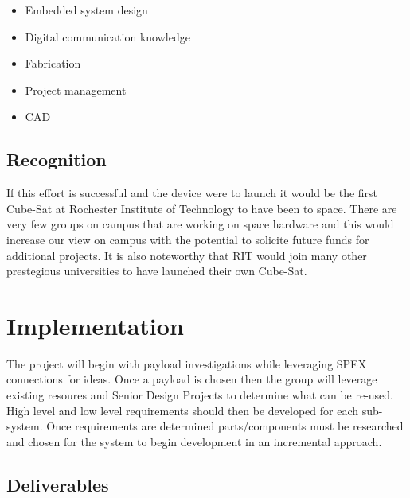 \documentclass[conference]{IEEEtran} %
\begin{document}
\begin{itemize}
\item Embedded system design
\item Digital communication knowledge
\item Fabrication
\item Project management
\item CAD
\end{itemize}


\subsection{Recognition}
\label{subsec:PublishedContent}
If this effort is successful and the device were to launch it would be the first Cube-Sat at Rochester Institute of Technology to have been to space.  There are very few groups on campus that are working on space hardware and this would increase our view on campus with the potential to solicite future funds for additional projects.  It is also noteworthy that RIT would join many other prestegious universities to have launched their own Cube-Sat.



\section{Implementation}
\label{sec:implementation}
The project will begin with payload investigations while leveraging SPEX connections for ideas.  Once a payload is chosen then the group will leverage existing resoures and Senior Design Projects to determine what can be re-used.  High level and low level requirements should then be developed for each sub-system.  Once requirements are determined parts/components must be researched and chosen for the system to begin development in an incremental approach.

\subsection{Deliverables}
\label{subsec:deliverables}
\end{document}
